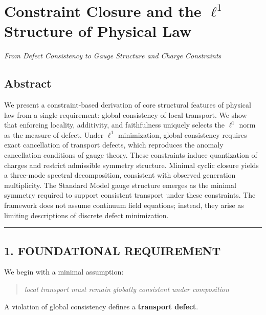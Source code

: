 \documentclass[
]{article}
\author{}
\date{}
\begin{document}
\section{\texorpdfstring{Constraint Closure and the \(\ell^1\) Structure
of Physical
Law}{Constraint Closure and the \textbackslash ell\^{}1 Structure of Physical Law}}\label{constraint-closure-and-the-ell1-structure-of-physical-law}

\emph{From Defect Consistency to Gauge Structure and Charge Constraints}

\subsection{Abstract}\label{abstract}

We present a constraint-based derivation of core structural features of
physical law from a single requirement: global consistency of local
transport. We show that enforcing locality, additivity, and faithfulness
uniquely selects the \(\ell^1\) norm as the measure of defect. Under
\(\ell^1\) minimization, global consistency requires exact cancellation
of transport defects, which reproduces the anomaly cancellation
conditions of gauge theory. These constraints induce quantization of
charges and restrict admissible symmetry structure. Minimal cyclic
closure yields a three-mode spectral decomposition, consistent with
observed generation multiplicity. The Standard Model gauge structure
emerges as the minimal symmetry required to support consistent transport
under these constraints. The framework does not assume continuum field
equations; instead, they arise as limiting descriptions of discrete
defect minimization.

\begin{center}\rule{0.5\linewidth}{0.5pt}\end{center}

\subsection{1. FOUNDATIONAL REQUIREMENT}\label{foundational-requirement}

We begin with a minimal assumption:

\begin{quote}
\emph{local transport must remain globally consistent under composition}
\end{quote}

A violation of global consistency defines a \textbf{transport defect}.
\end{document}
